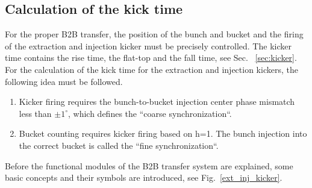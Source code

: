 \subsection{Calculation of the kick time}
For the proper B2B transfer, the position of the bunch and bucket and the firing of the extraction and injection kicker must be precisely controlled. The kicker time contains the rise time, the flat-top and the fall time, see Sec. ~\ref{sec:kicker}. For the calculation of the kick time for the extraction and injection kickers, the following idea must be followed. 
\begin{enumerate}
\item Kicker firing requires the bunch-to-bucket injection center phase mismatch less than $\pm 1^\circ$, which defines the ``coarse synchronization``.
\item Bucket counting requires kicker firing based on h=1. The bunch injection into the correct bucket is called the ``fine synchronization``.
\end{enumerate}

Before the functional modules of the B2B transfer system are explained, some basic concepts and their symbols are introduced, see Fig.~\ref{ext_inj_kicker}.


